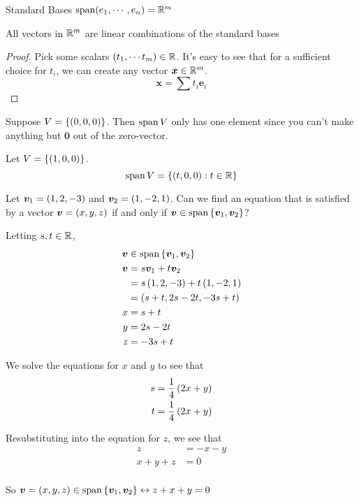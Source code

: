 \documentclass[11pt]{article}
\begin{document}
\begin{theorem}{Standard Bases}
  $\operatorname{span} (e_1, \cdots, e_n) = \mathbb R^m$
  
  All vectors in $\mathbb R^m$ are linear combinations of the standard bases
  \begin{proof}
    Pick some scalars $\left ( t_1, \cdots t_m \right) \in \mathbb R$.
    It's easy to see that for a sufficient choice for $t_i$, we can create any vector $\bm{x} \in \mathbb{R}^m$.
    $$
    \bm{x} = \sum t_i \bm{e}_i
    $$
  \end{proof}
\end{theorem}









\begin{example}
  
  Suppose $V = \left \{ \left ( 0, 0, 0 \right) \right \}$.
  Then $\operatorname{span} V$ only has one element since you can't make anything but $\bm{0}$ out of the zero-vector.
\end{example}

\begin{example}

  Let $V = \left \{ \left ( 1, 0, 0 \right) \right \}$.
  $$
  \operatorname{span} V = \left \{ \left ( t, 0, 0 \right) : t \in \mathbb R \right \}
  $$
\end{example}

\begin{example}
  
  Let $\bm{v}_1 = \left ( 1, 2, -3 \right)$ and $\bm{v}_2 = \left ( 1, -2, 1 \right)$.
  Can we find an equation that is satisfied by a vector $\bm{v} = \left ( x, y, z \right)$ if and only if $\bm{v} \in \operatorname{span} \left \{ \bm{v}_1, \bm{v}_2 \right \}$?

  Letting $s,t \in \mathbb R$,
  \begin{align*}
    \bm{v} &\in \operatorname{span} \left \{ \bm{v}_1, \bm{v}_2 \right \} \\
    \bm{v} &= s \bm{v}_1 + t \bm{v}_2 \\
           &= s \left ( 1,2,-3 \right) + t \left ( 1, -2, 1 \right) \\
           &= \left ( s+t, 2s-2t, -3s+t \right) \\
    x &= s+t \\
    y &= 2s-2t \\
    z &= -3s+t \\
  \end{align*}

  We solve the equations for $x$ and $y$ to see that
  \begin{align*}
    s &= \frac{1}{4} \left ( 2x+y \right) \\
    t &= \frac{1}{4} \left ( 2x+y \right) \\
  \end{align*}

  Resubstituting into the equation for $z$, we see that
  \begin{align*}
    z &= -x-y \\
    x+y+z &= 0 \\
  \end{align*}

  So $\bm{v} = \left ( x, y, z \right) \in \operatorname{span} \left \{ \bm{v}_1, \bm{v}_2 \right \} \leftrightarrow z+x+y=0$
\end{example}
\end{document}

